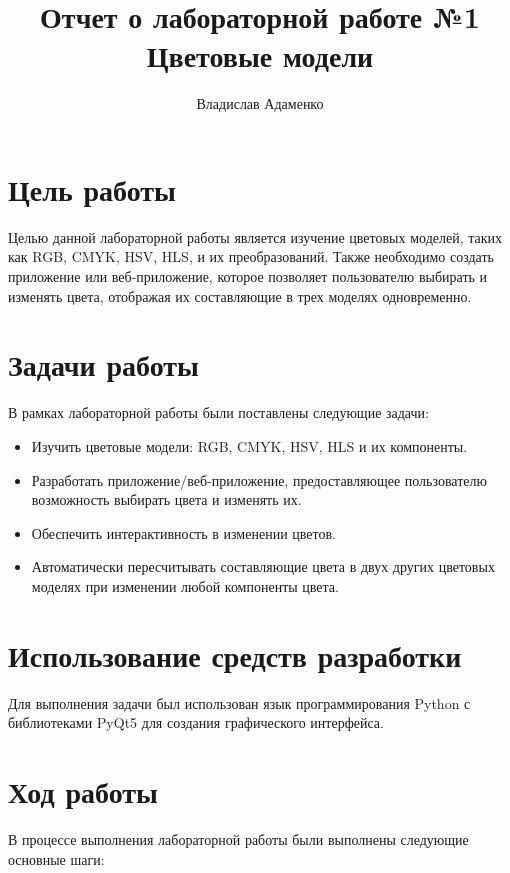 \documentclass{article}
\begin{document}
    \title{Отчет о лабораторной работе №1\\ Цветовые модели}
    \author{Владислав Адаменко}
    \maketitle

    \section{Цель работы}
    Целью данной лабораторной работы является изучение цветовых моделей, таких как RGB, CMYK, HSV, HLS, и их преобразований. Также необходимо создать приложение или веб-приложение, которое позволяет пользователю выбирать и изменять цвета, отображая их составляющие в трех моделях одновременно.

    \section{Задачи работы}
    В рамках лабораторной работы были поставлены следующие задачи:
    \begin{itemize}
        \item Изучить цветовые модели: RGB, CMYK, HSV, HLS и их компоненты.
        \item Разработать приложение/веб-приложение, предоставляющее пользователю возможность выбирать цвета и изменять их.
        \item Обеспечить интерактивность в изменении цветов.
        \item Автоматически пересчитывать составляющие цвета в двух других цветовых моделях при изменении любой компоненты цвета.
    \end{itemize}

    \section{Использование средств разработки}
    Для выполнения задачи был использован язык программирования Python с библиотеками PyQt5 для создания графического интерфейса.

    \section{Ход работы}

    В процессе выполнения лабораторной работы были выполнены следующие основные шаги:
\end{document}

